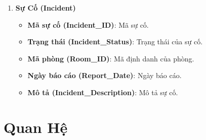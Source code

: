 \documentclass[a4paper,12pt]{article}
\begin{document}
\begin{enumerate}
    \item \textbf{Sự Cố (Incident)}
    \begin{itemize}
        \item \textbf{Mã sự cố (Incident\_ID)}: Mã sự cố.
        \item \textbf{Trạng thái (Incident\_Status)}: Trạng thái của sự cố.
        \item \textbf{Mã phòng (Room\_ID)}: Mã định danh của phòng.
        \item \textbf{Ngày báo cáo (Report\_Date)}: Ngày báo cáo.
        \item \textbf{Mô tả (Incident\_Description)}: Mô tả sự cố.
    \end{itemize}
\end{enumerate}

\section{Quan Hệ}
\end{document}
